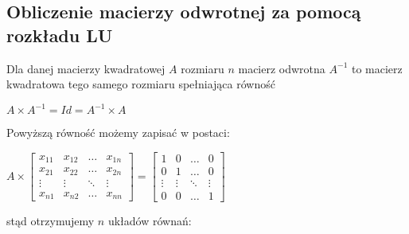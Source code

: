 \documentclass[11pt]{article}
\begin{document}
\subsection{Obliczenie macierzy odwrotnej za pomocą rozkładu LU}
Dla danej macierzy kwadratowej $A$ rozmiaru $n$ macierz odwrotna $A^{-1}$ to macierz kwadratowa tego samego rozmiaru spełniająca równość
\begin{center}
$A \times A^{-1} = Id = A^{-1} \times A$
\end{center}
Powyższą równość możemy zapisać w postaci:
\begin{center}
\begin{math}
A \times 
\begin{bmatrix}
    x_{11} & x_{12} & \dots  & x_{1n} \\
    x_{21} & x_{22} & \dots  & x_{2n} \\
    \vdots & \vdots & \ddots & \vdots \\
    x_{n1} & x_{n2} & \dots  & x_{nn}
\end{bmatrix}
=
\begin{bmatrix}
    1 & 0 & \dots  & 0 \\
    0 & 1 & \dots  & 0 \\
    \vdots & \vdots & \ddots & \vdots \\
    0 & 0 & \dots  & 1
\end{bmatrix}
\end{math}
\end{center}
stąd otrzymujemy $n$ układów równań:
\end{document}
